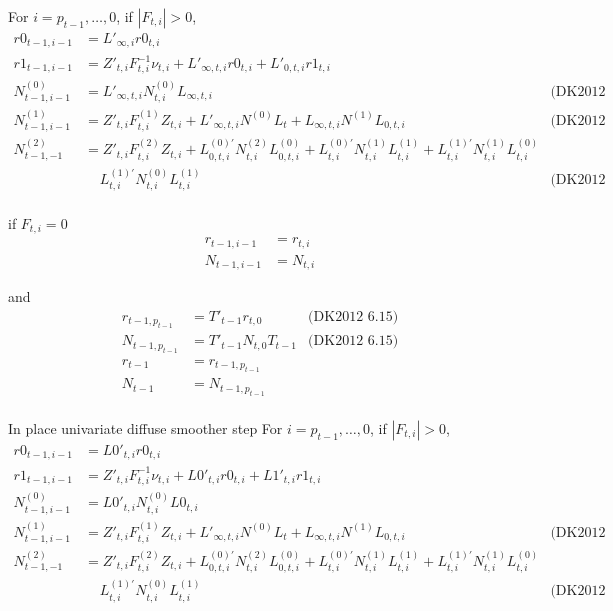 \documentclass{article}
\begin{document}
For $i = p_{t-1},\ldots,0$, if $|F_{t,i}| > 0$,
\begin{align*}
  r0_{t-1,i-1} &= L'_{\infty,i}r0_{t,i} \\
  r1_{t-1,i-1} &= Z'_{t,i}F^{-1}_{t,i}\nu_{t,i} +
                 L'_{\infty,t,i}r0_{t,i} + L'_{0,t,i}r1_{t,i} \\
  N^{(0)}_{t-1,i-1} &= L'_{\infty,t,i}N^{(0)}_{t,i}L_{\infty,t,i} & \mbox{(DK2012 5.26)}\\
  N^{(1)}_{t-1,i-1} &= Z'_{t,i}F^{(1)}_{t,i}Z_{t,i} + L'_{\infty,t,i}N^{(0)}L_t
                  +L_{\infty,t,i}N^{(1)}L_{0,t,i}
                  & \mbox{(DK2012 5.29)}\\
  N^{(2)}_{t-1,-1} &= Z'_{t,i}F^{(2)}_{t,i}Z_{t,i} + L^{(0)'}_{0,t,i}N^{(2)}_{t,i}L^{(0)}_{0,t,i} +
                  L^{(0)'}_{t,i}N^{(1)}_{t,i}L^{(1)}_{t,i} +
                  L^{(1)'}_{t,i}N^{(1)}_{t,i}L^{(0)}_{t,i} \\
  &\;\;\;\;  L^{(1)'}_{t,i}N^{(0)}_{t,i}L^{(1)}_{t,i} & \mbox{(DK2012 5.29)}\\
\end{align*}

if $F_{t,i} = 0$
\begin{align*}
  r_{t-1,i-1} &= r_{t,i} \\
  N_{t-1,i-1} &= N_{t,i}
\end{align*}

and
\begin{align*}
  r_{t-1,p_{t-1}} &= T'_{t-1}r_{t,0} & \mbox{(DK2012 6.15)}\\
  N_{t-1,p_{t-1}} &= T'_{t-1}N_{t,0}T_{t-1}  & \mbox{(DK2012 6.15)}\\
  r_{t-1} &= r_{t-1, p_{t-1}}\\
  N_{t-1} &= N_{t-1, p_{t-1}}\\
\end{align*}

In place univariate diffuse smoother step
For $i = p_{t-1},\ldots,0$, if $|F_{t,i}| > 0$,
\begin{align*}
  r0_{t-1,i-1} &= L0'_{t,i}r0_{t,i} \\
  r1_{t-1,i-1} &= Z'_{t,i}F^{-1}_{t,i}\nu_{t,i} +
                 L0'_{t,i}r0_{t,i} + L1'_{t,i}r1_{t,i} \\
  N^{(0)}_{t-1,i-1} &= L0'_{t,i}N^{(0)}_{t,i}L0_{t,i}\\
  N^{(1)}_{t-1,i-1} &= Z'_{t,i}F^{(1)}_{t,i}Z_{t,i} + L'_{\infty,t,i}N^{(0)}L_t
                  +L_{\infty,t,i}N^{(1)}L_{0,t,i}
                  & \mbox{(DK2012 5.29)}\\
  N^{(2)}_{t-1,-1} &= Z'_{t,i}F^{(2)}_{t,i}Z_{t,i} + L^{(0)'}_{0,t,i}N^{(2)}_{t,i}L^{(0)}_{0,t,i} +
                  L^{(0)'}_{t,i}N^{(1)}_{t,i}L^{(1)}_{t,i} +
                  L^{(1)'}_{t,i}N^{(1)}_{t,i}L^{(0)}_{t,i} \\
  &\;\;\;\;  L^{(1)'}_{t,i}N^{(0)}_{t,i}L^{(1)}_{t,i} & \mbox{(DK2012 5.29)}\\
\end{align*}
\end{document}
